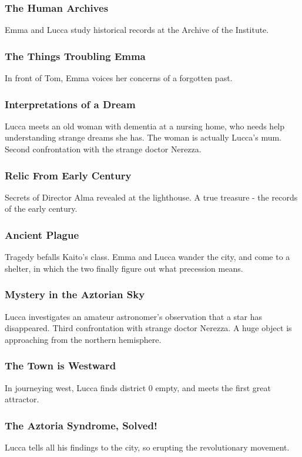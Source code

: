 \documentclass[11pt]{article}
\begin{document}
		\subsubsection{The Human Archives}
		Emma and Lucca study historical records at the Archive of the Institute.
		\subsubsection{The Things Troubling Emma}
		In front of Tom, Emma voices her concerns of a forgotten past.
		\subsubsection{Interpretations of a Dream}
		Lucca meets an old woman with dementia at a nursing home, who needs help understanding strange dreams she has. 
		The woman is actually Lucca's mum.
		Second confrontation with the strange doctor Nerezza.
		\subsubsection{Relic From Early Century}
		Secrets of Director Alma revealed at the lighthouse.
		A true treasure - the records of the early century.
		\subsubsection{Ancient Plague}
		Tragedy befalls Kaito's class.
		Emma and Lucca wander the city, and come to a shelter, in which the two finally figure out what precession means.
		\subsubsection{Mystery in the Aztorian Sky}
		Lucca investigates an amateur astronomer's observation that a star has disappeared.
		Third confrontation with strange doctor Nerezza.
		A huge object is approaching from the northern hemisphere.
		\subsubsection{The Town is Westward}
		In journeying west, Lucca finds district 0 empty, and meets the first great attractor.
		\subsubsection{The Aztoria Syndrome, Solved!}
		Lucca tells all his findings to the city, so erupting the revolutionary movement.
	\newpage
\end{document}

